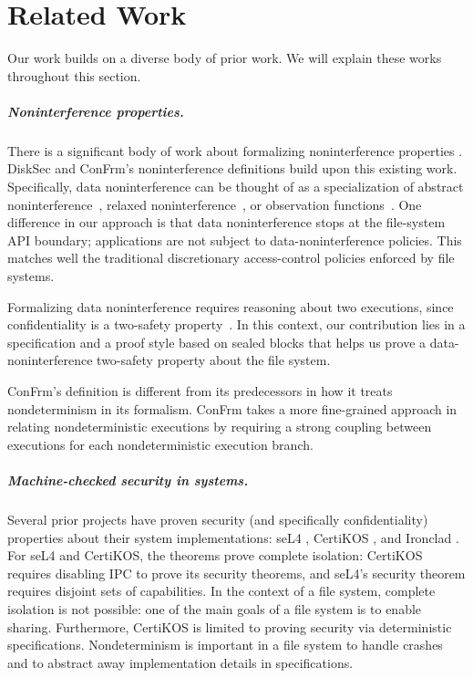 \chapter{Related Work}
\label{chapter:Related_work}
Our work builds on a diverse body of prior work. We will explain these works throughout this section. 

\paragraph{Noninterference properties.} There is a significant body of work about formalizing noninterference properties \cite{19, 25, 26, 29, 30, 32}. DiskSec and ConFrm’s noninterference definitions build upon this existing work. Specifically, data noninterference can be thought of as a specialization of
abstract noninterference~\cite{giacobazzi:abstract}, relaxed
noninterference~\cite{li:relaxed}, or observation
functions~\cite{costanzo:certikos-infoflow}.  One difference in our approach is that
data noninterference stops at the file-system API boundary; applications are
not subject to data-noninterference policies.  This matches well the
traditional discretionary access-control policies enforced by file systems.

Formalizing data noninterference requires reasoning about two executions, since
confidentiality is a two-safety property~\cite{terauchi:safety}.  In this
context, our contribution lies in a specification and a proof style based on
sealed blocks that helps us
prove a data-noninterference two-safety property about the file system.



ConFrm’s definition is different from its predecessors in how it treats nondeterminism in its formalism. ConFrm takes a more fine-grained approach in relating nondeterministic executions by requiring a strong coupling between executions for each nondeterministic execution branch. 

\paragraph{Machine-checked security in systems.} 
Several prior projects have proven security (and specifically confidentiality) properties about their system implementations: seL4 \cite{23, 26}, CertiKOS \cite{15}, and Ironclad \cite{20}. For seL4 and CertiKOS, the theorems prove complete isolation: CertiKOS requires disabling IPC to prove its security theorems, and seL4’s security theorem requires disjoint sets of capabilities. In the context of a file system, complete isolation is not possible: one of the main goals of a file system is to enable sharing. Furthermore, CertiKOS is limited to proving security via deterministic specifications. Nondeterminism is important in a file system to handle crashes and to abstract away implementation details in specifications. 

